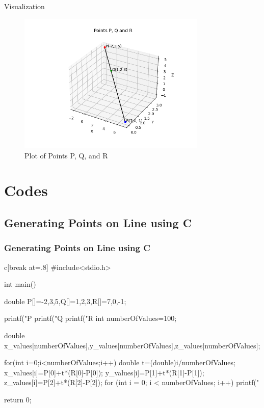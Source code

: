\documentclass{beamer}
\numberwithin{equation}{section}
\begin{document}
\begin{frame}{Visualization}
    \begin{figure}
        \centering
        \includegraphics[width=0.8\textwidth]{fig/fig.png} 
	    \caption{Plot of Points P, Q, and R}
    \end{figure}
\end{frame}

\section{Codes}
\subsection{Generating Points on Line using C}

\begin{frame}
\frametitle{Generating Points on Line using C}
\begin{mintedbox}{c}[break at=.8\textheight]
#include<stdio.h>

int main(){
	double P[]={-2,3,5},Q[]={1,2,3},R[]={7,0,-1};
	
	printf("P %
	printf("Q %
	printf("R %
	int numberOfValues=100;

	double x_values[numberOfValues],y_values[numberOfValues],z_values[numberOfValues];

	for(int i=0;i<numberOfValues;i++){
		double t=(double)i/numberOfValues;
		x_values[i]=P[0]+t*(R[0]-P[0]);
		y_values[i]=P[1]+t*(R[1]-P[1]);
		z_values[i]=P[2]+t*(R[2]-P[2]);
	}
	for (int i = 0; i < numberOfValues; i++) {
        printf("%
    }

    return 0;
}
\end{mintedbox}
\end{frame}
\end{document}
